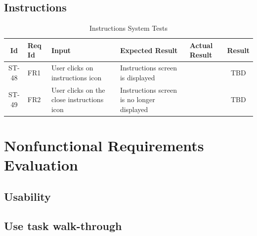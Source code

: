 \documentclass[12pt, titlepage]{article}
\begin{document}
\subsection{Instructions}

\begin{center}
    \begin{longtable}{|c|p{1cm}|p{2.7cm}|p{3cm}|p{3cm}|c|}
        \caption{Instructions System Tests \label{long}}\\
        \hline
        \textbf{Id} & \textbf{Req Id} & \textbf{Input} & \textbf{Expected Result} & \textbf{Actual Result} & \textbf{Result}   \\
        \hline
        ST-48 & FR1 & User clicks on instructions icon & Instructions screen is displayed & & TBD \\
        \hline
        ST-49 & FR2 & User clicks on the close instructions icon & Instructions screen is no longer displayed & & TBD \\
        \hline
    \end{longtable}
\end{center}

\newpage

\section{Nonfunctional Requirements Evaluation}

\subsection{Usability}

\subsection{Use task walk-through}
\end{document}

